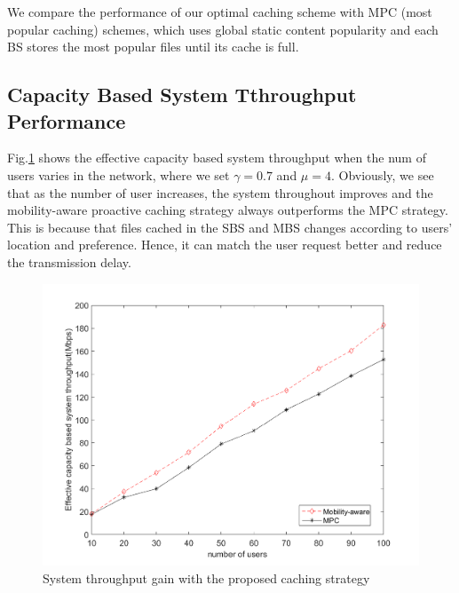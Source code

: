 \documentclass[conference]{IEEEtran}
\begin{document}
We compare the performance of our optimal caching scheme with MPC (most popular caching) schemes, which uses global static content popularity and each BS stores the most popular files until its cache is full\cite{6600983}.
\subsection{Capacity Based System Tthroughput Performance}
  Fig.\ref{fig 3} shows the effective capacity based system throughput when the num of users varies in the network, where we set $\gamma=0.7$ and $\mu=4$. Obviously, we see that as the number of user increases, the system throughout improves and the mobility-aware proactive caching strategy always outperforms the MPC strategy. This is because that files cached in the SBS and MBS changes according to users’ location and preference. Hence, it can match the user request better and reduce the transmission delay.
\begin{figure}[htbp]
 \centerline{\includegraphics[scale=0.35]{fig3.png}}
 \caption{System throughput gain with the proposed caching strategy}
 \label{fig 3}
\end{figure}
\end{document}
